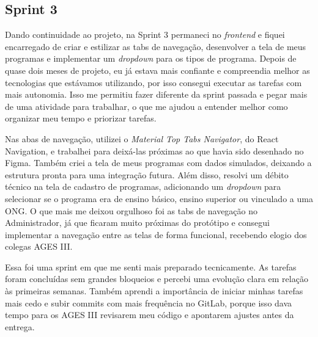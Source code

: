 \subsection{Sprint 3}

Dando continuidade ao projeto, na Sprint 3 permaneci no \textit{frontend} e fiquei encarregado de criar e estilizar as tabs de navegação, desenvolver a tela de meus programas e implementar um \textit{dropdown} para os tipos de programa. Depois de quase dois meses de projeto, eu já estava mais confiante e compreendia melhor as tecnologias que estávamos utilizando, por isso consegui executar as tarefas com mais autonomia. Isso me permitiu fazer diferente da sprint passada e pegar mais de uma atividade para trabalhar, o que me ajudou a entender melhor como organizar meu tempo e priorizar tarefas.

Nas abas de navegação, utilizei o \textit{Material Top Tabs Navigator}, do React Navigation, e trabalhei para deixá-las próximas ao que havia sido desenhado no Figma. Também criei a tela de meus programas com dados simulados, deixando a estrutura pronta para uma integração futura. Além disso, resolvi um débito técnico na tela de cadastro de programas, adicionando um \textit{dropdown} para selecionar se o programa era de ensino básico, ensino superior ou vinculado a uma ONG. O que mais me deixou orgulhoso foi as tabs de navegação no Administrador, já que ficaram muito próximas do protótipo e consegui implementar a navegação entre as telas de forma funcional, recebendo elogio dos colegas AGES III.

Essa foi uma sprint em que me senti mais preparado tecnicamente. As tarefas foram concluídas sem grandes bloqueios e percebi uma evolução clara em relação às primeiras semanas. Também aprendi a importância de iniciar minhas tarefas mais cedo e subir commits com mais frequência no GitLab, porque isso dava tempo para os AGES III revisarem meu código e apontarem ajustes antes da entrega.
